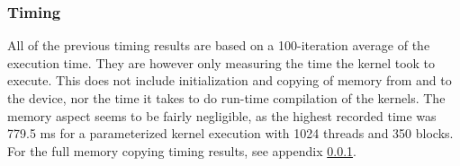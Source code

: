 \begin{table}[h!]
\centering
{}
\caption{Number of unequal results with various error tolerances\label{table:errorComparison}}
\end{table}

\subsubsection{Timing}
All of the previous timing results are based on a 100-iteration average of the execution time.
They are however only measuring the time the kernel took to execute.
This does not include initialization and copying of memory from and to the device, nor the time it takes to do run-time compilation of the kernels.
The memory aspect seems to be fairly negligible, as the highest recorded time was 779.5 ms for a parameterized kernel execution with 1024 threads and 350 blocks.
For the full memory copying timing results, see appendix \ref{}.

